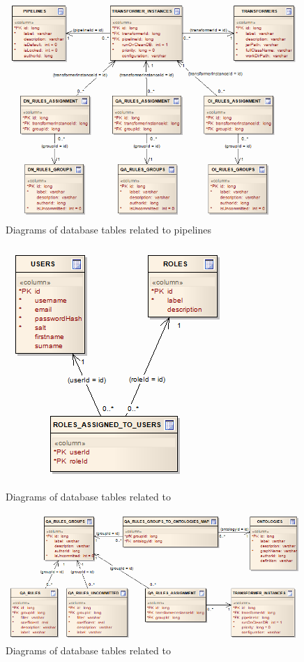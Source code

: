 \begin{figure}[htbp]
    \centering
    \includegraphics[scale=0.6]{images/db-pipelines.png}
    \caption{Diagrams of database tables related to pipelines}
	\label{fig:dbPipelines}
\end{figure}

\begin{figure}[htbp]
    \centering
    \includegraphics[scale=0.6]{images/db-fe.png}
    \caption{Diagrams of database tables related to \FE}
	\label{fig:dbFrontend}
\end{figure}

\begin{figure}[htbp]
    \centering
    \includegraphics[scale=0.6]{images/db-qa.png}
    \caption{Diagrams of database tables related to \QA}
	\label{fig:dbQA}
\end{figure}

